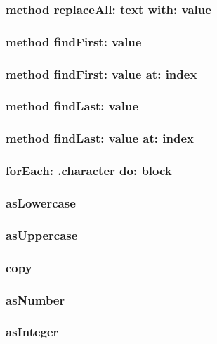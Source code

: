 \subsubsection{method replaceAll: text with: value}

\subsubsection{method findFirst: value}

\subsubsection{method findFirst: value at: index}

\subsubsection{method findLast: value}

\subsubsection{method findLast: value at: index}

\subsubsection{forEach: .character do: block}

\subsubsection{asLowercase}

\subsubsection{asUppercase}

\subsubsection{copy}

\subsubsection{asNumber}

\subsubsection{asInteger}


